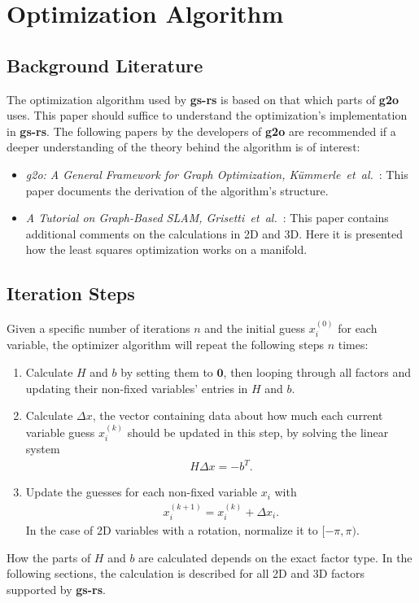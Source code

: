 \section{Optimization Algorithm}

\subsection{Background Literature}

The optimization algorithm used by \textbf{gs-rs} is based on that which parts of \textbf{g2o} uses. This paper should suffice to understand the optimization's implementation in \textbf{gs-rs}. The following papers by the developers of \textbf{g2o} are recommended if a deeper understanding of the theory behind the algorithm is of interest:
\begin{itemize}
	\item \textit{g2o: A General Framework for Graph Optimization, Kümmerle~et~al.}~\cite{kummerle2011g2o}: This paper documents the derivation of the algorithm's structure.
	\item \textit{A Tutorial on Graph-Based SLAM, Grisetti~et~al.}~\cite{grisetti2010tutorial}: This paper contains additional comments on the calculations in 2D and 3D. Here it is presented how the least squares optimization works on a manifold.
\end{itemize}

\subsection{Iteration Steps}

Given a specific number of iterations $n$ and the initial guess $x_i^{(0)}$ for each variable, the optimizer algorithm will repeat the following steps $n$ times:
\begin{enumerate}
	\item Calculate $H$ and $b$ by setting them to $\boldsymbol{0}$, then looping through all factors and updating their non-fixed variables' entries in $H$ and $b$.
	\item Calculate $\Delta x$, the vector containing data about how much each current variable guess $x_i^{(k)}$ should be updated in this step, by solving the linear system
		\begin{align}
			H \Delta x = -b^T.
		\end{align}
	\item Update the guesses for each non-fixed variable $x_i$ with
		\begin{align}
			x_i^{(k+1)} = x_i^{(k)} + \Delta x_i.
		\end{align}
		In the case of 2D variables with a rotation, normalize it to $[-\pi, \pi)$.
\end{enumerate}
How the parts of $H$ and $b$ are calculated depends on the exact factor type. In the following sections, the calculation is described for all 2D and 3D factors supported by \textbf{gs-rs}.